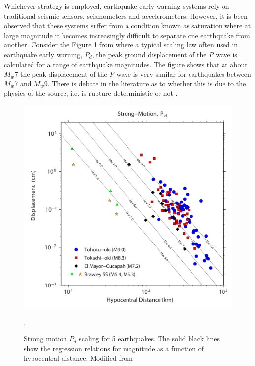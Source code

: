 Whichever strategy is employed, earthquake early warning systems rely on traditional seismic sensors, seismometers and accelerometers. However, it is been observed that these systems suffer from a condition known as saturation \citep{Brown2011} where at large magnitude it becomes increasingly difficult to separate one earthquake from another. Consider the Figure \ref{fig_pd_scaling} from \citet{Crowell2013} where a typical scaling law often used in earthquake early warning, $P_d$, the peak ground displacement of the \textit{P} wave \citep{wu2007_Pd} is calculated for a range of earthquake magnitudes. The figure shows that at about $M_w$7 the peak displacement of the \textit{P} wave is very similar for earthquakes between $M_w$7 and $M_w$9. There is debate in the literature as to whether this is due to the physics of the source, i.e. is rupture deterministic or not \citep{olson2005}.

\begin{figure}[!ht] 
  \centering
  \includegraphics[width=0.99\linewidth]{./figures/ch1/pd_scaling.pdf}
    \caption[Strong motion $P_d$ scaling]{Strong motion $P_d$ scaling for 5 earthquakes. The solid black lines show the regression relations for magnitude as a function of hypocentral distance. Modified from \citep{Crowell2013}}.
  \label{fig_pd_scaling}
\end{figure}

